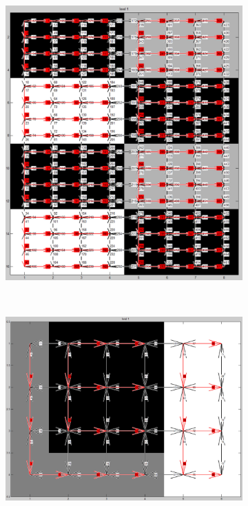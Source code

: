 \documentclass[12pt]{article}
\begin{document}
\begin{figure}[tb]
  \centering
    \begin{subfigure}[t]{0.3\textwidth}
      \includegraphics[width=\textwidth]{img/contract2.jpg}
      \caption{}\label{fig:dart_contract2}
    \end{subfigure}~%
    \begin{subfigure}[t]{0.3\textwidth}
      \includegraphics[width=\textwidth]{img/contract3.jpg}

\end{subfigure}
\end{figure}
\end{document}
